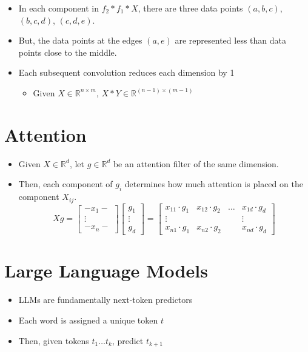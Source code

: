 \documentclass{article}
\begin{document}
\begin{itemize}
    \item In each component in $f_2 * f_1 * X$, there are three data points $(a, b, c)$, $(b, c, d)$, $(c, d, e)$.
    \item But, the data points at the edges $(a, e)$ are represented less than data points close to the middle.
    \item Each subsequent convolution reduces each dimension by 1
        \begin{itemize}
            \item Given $X \in \mathbb{R}^{n \times m}$, $X * Y \in \mathbb{R}^{(n-1) \times (m-1)}$
        \end{itemize}
\end{itemize}

\section{Attention}
\begin{itemize}
    \item Given $X \in \mathbb{R}^d$, let $g \in \mathbb{R}^d$ be an attention filter of the same dimension.
    \item Then, each component of $g_i$ determines how much attention is placed on the component $X_{ij}$.
    \[
        X g = \begin{bmatrix} - x_1 - \\ \vdots \\ - x_n - \end{bmatrix} \begin{bmatrix} g_1 \\ \vdots \\ g_d \end{bmatrix} = \begin{bmatrix} x_{11} \cdot g_1 & x_{12} \cdot g_2 & \ldots & x_{1d} \cdot g_d \\ \vdots & & & \vdots \\ x_{n1} \cdot g_1 & x_{n2} \cdot g_2 & & x_{nd} \cdot g_d \end{bmatrix}
    \]
\end{itemize}

\section{Large Language Models}
\begin{itemize}
    \item LLMs are fundamentally next-token predictors
    \item Each word is assigned a unique token $t$
    \item Then, given tokens $t_1 \ldots t_k$, predict $t_{k+1}$
\end{itemize}
\end{document}
